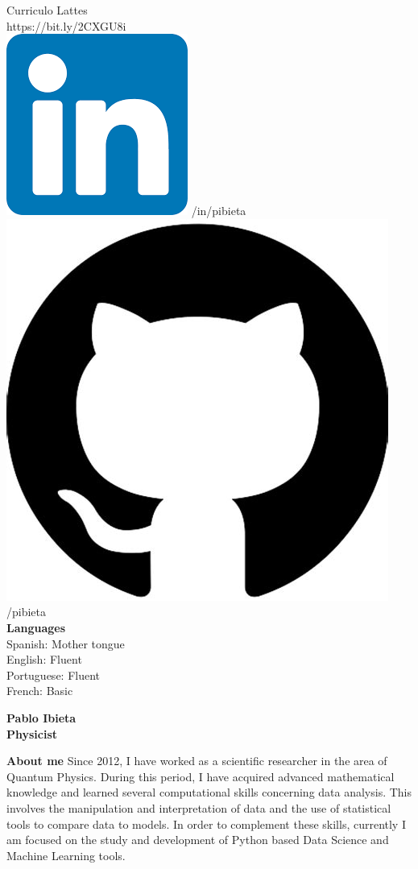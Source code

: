 \documentclass[a4paper,12pt,final]{memoir}
\newcommand{\Sep}{\vspace{1.5em}}
\newenvironment{AboutMe}
	{\ignorespaces\textbf{\color{RoyalBlue} About me}}
	{\Sep\ignorespacesafterend}
\begin{document}
\begin{flushleft}
	\vspace{1mm}
	Curriculo Lattes \\
	\vspace{1mm}
	https://bit.ly/2CXGU8i\\
	\vspace{1mm}
    \includegraphics[width=0.07\columnwidth]{in_icon.png} /in/pibieta \\
    \vspace{1mm}
    \includegraphics[width=0.07\columnwidth]{git.jpeg} /pibieta \\
    \vspace{1mm}
    \vspace{4mm}
	\textbf{Languages}\\
	\vspace{1mm}
	Spanish: Mother tongue\\
	\vspace{1mm}
	English: Fluent\\
	\vspace{1mm}
	Portuguese: Fluent\\
	\vspace{1mm}
	French: Basic
	\vspace{1mm}
\end{flushleft}\normalsize


\framebreak



\Huge\bfseries {\color{RoyalBlue} Pablo Ibieta} \\
\Large\bfseries Physicist \\

\normalsize\normalfont

\begin{AboutMe}
Since 2012, I have worked as a scientific researcher in the area of Quantum Physics. During this period, I have acquired advanced mathematical knowledge and learned several computational skills concerning data analysis. This involves the manipulation and interpretation of data and the use of statistical tools to compare data to models. In order to complement these skills, currently I am focused on the study and development of Python based Data Science and Machine Learning tools.  
\end{AboutMe}
\end{document}
